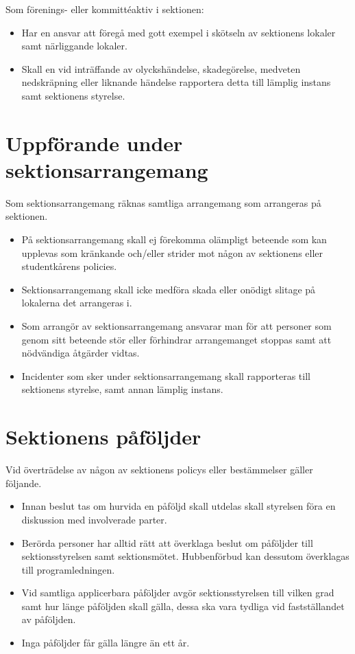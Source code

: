 \documentclass[11pt, includeaddress]{classes/cthit}
\begin{document}
Som förenings- eller kommittéaktiv i sektionen:

\begin{itemize}
	\item Har en ansvar att föregå med gott exempel i skötseln av sektionens lokaler samt närliggande lokaler.
	\item Skall en vid inträffande av olyckshändelse, skadegörelse, medveten nedskräpning eller liknande händelse rapportera detta till lämplig instans samt sektionens styrelse.
	
\end{itemize}

\section{Uppförande under sektionsarrangemang}
Som sektionsarrangemang räknas samtliga arrangemang som arrangeras på sektionen.

\begin{itemize}
	\item På sektionsarrangemang skall ej förekomma olämpligt beteende som kan upplevas som kränkande och/eller strider mot någon av sektionens eller studentkårens policies.
	\item Sektionsarrangemang skall icke medföra skada eller onödigt slitage på lokalerna det arrangeras i.
 	\item Som arrangör av sektionsarrangemang ansvarar man för att personer som genom sitt beteende stör eller förhindrar arrangemanget stoppas samt att nödvändiga åtgärder vidtas.
	\item Incidenter som sker under sektionsarrangemang skall rapporteras till sektionens styrelse, samt annan lämplig instans.

\end{itemize}

\section{Sektionens påföljder}
Vid överträdelse av någon av sektionens policys eller bestämmelser gäller följande.

\begin{itemize}
    \item Innan beslut tas om hurvida en påföljd skall utdelas skall styrelsen föra en diskussion med involverade parter. 
    \item Berörda personer har alltid rätt att överklaga beslut om påföljder till sektionsstyrelsen samt sektionsmötet. Hubbenförbud kan dessutom överklagas till programledningen. 
    \item Vid samtliga applicerbara påföljder avgör sektionsstyrelsen till vilken grad samt hur länge påföljden skall gälla, dessa ska vara tydliga vid fastställandet av påföljden.
    \item Inga påföljder får gälla längre än ett år.
\end{itemize}
\end{document}
